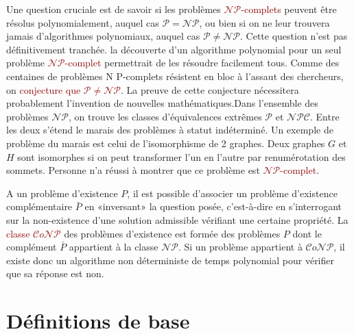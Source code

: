 \documentclass{article}
\newcommand{\red}[1]{\textcolor{darkred}{#1}}
\begin{document}
Une question cruciale est de savoir si les problèmes \red{$\mathcal{N}\mathcal{P}$-complets} peuvent être résolus polynomialement, auquel cas $\mathcal{P} = 
\mathcal{N}\mathcal{P}$, ou bien si on ne leur trouvera jamais d’algorithmes polynomiaux, auquel cas $\mathcal{P} \neq \mathcal{N}\mathcal{P}$. Cette question n’est pas 
définitivement tranchée. la découverte d’un algorithme polynomial pour un seul problème \red{$\mathcal{N}\mathcal{P}$-complet} permettrait de les résoudre facilement tous. 
Comme des centaines de problèmes N P-complets résistent en bloc à l’assaut des
chercheurs, on \red{conjecture que  $\mathcal{P} \neq \mathcal{N}\mathcal{P}$}. La preuve de cette conjecture nécessitera probablement l’invention de nouvelles 
mathématiques.Dans l’ensemble des problèmes $\mathcal{N}\mathcal{P}$, on trouve les classes d’équivalences extrêmes $\mathcal{P}$ et 
$\mathcal{N}\mathcal{P}\mathcal{C}$. Entre les deux s’étend le marais des problèmes à statut indéterminé. Un exemple de problème du marais est celui de l’isomorphisme de 2 
graphes. Deux graphes $G$ et $H$ sont isomorphes si on peut transformer l’un en l’autre par renumérotation des sommets. Personne n’a réussi à montrer que ce problème est 
\red{$\mathcal{N}\mathcal{P}$-complet}.

A un problème d’existence $P$, il est possible d’associer un problème d’existence complémentaire $\bar{P}$ en «inversant» la question posée, c’est-à-dire en s’interrogant sur la 
non-existence d’une solution admissible vérifiant une certaine propriété. La \red{classe $\mathcal{C}o\mathcal{N}\mathcal{P}$} des problèmes d’existence est formée des 
problèmes $P$ dont le complément $\bar{P}$ appartient à la classe $\mathcal{N}\mathcal{P}$. Si un problème appartient à $\mathcal{C}o\mathcal{N}\mathcal{P}$, il existe 
donc un algorithme non déterministe de temps polynomial pour vérifier que sa réponse est non.

\section{Définitions de base}
\end{document}
